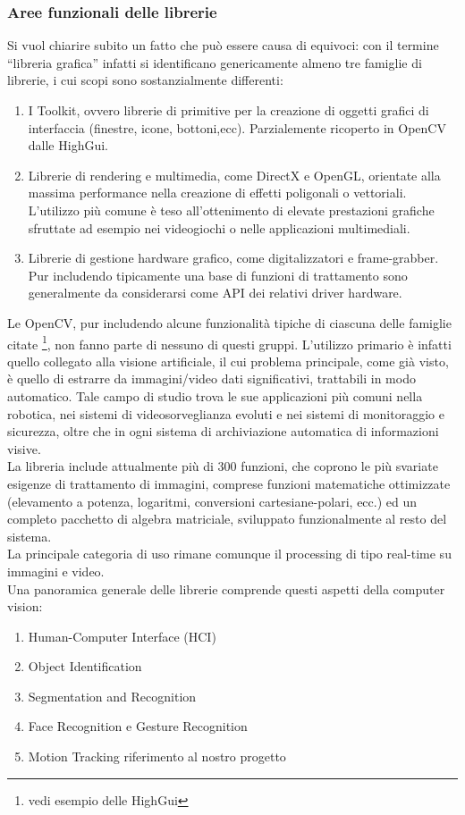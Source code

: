 \subsubsection{Aree funzionali delle librerie}
Si vuol chiarire subito un fatto che può essere causa di equivoci: con il termine ``libreria grafica'' infatti si identificano genericamente almeno tre famiglie di librerie, i cui scopi sono sostanzialmente differenti:
\begin{enumerate}
 \item  I Toolkit, ovvero librerie di primitive per la creazione di oggetti grafici di interfaccia (finestre, icone, bottoni,ecc). Parzialemente ricoperto in OpenCV dalle HighGui.
\item Librerie di rendering e multimedia, come DirectX e OpenGL, orientate alla massima performance nella creazione di effetti poligonali o vettoriali. L’utilizzo più comune è teso all’ottenimento di elevate prestazioni    grafiche sfruttate ad esempio nei videogiochi o nelle applicazioni multimediali.
\item  Librerie di gestione hardware grafico, come digitalizzatori e frame-grabber. Pur includendo tipicamente una base di funzioni di trattamento sono generalmente da considerarsi come API dei relativi driver hardware.
\end{enumerate}

Le OpenCV, pur includendo alcune funzionalità tipiche di ciascuna delle famiglie citate \footnote{vedi esempio delle HighGui}, non fanno parte di nessuno di questi gruppi. L’utilizzo primario è infatti quello collegato alla visione artificiale, il cui problema principale, come già visto, è quello di estrarre da immagini/video dati significativi, trattabili in modo automatico. Tale campo di studio trova le sue applicazioni più comuni nella robotica, nei sistemi di  videosorveglianza evoluti e nei sistemi di monitoraggio e sicurezza, oltre che in ogni sistema di archiviazione automatica di informazioni visive.\\
La libreria include attualmente più di 300 funzioni, che coprono le più svariate esigenze di trattamento di immagini, comprese funzioni matematiche ottimizzate (elevamento a potenza, logaritmi, conversioni cartesiane-polari, ecc.) ed  un completo pacchetto di algebra matriciale, sviluppato funzionalmente al resto del sistema.\\

La principale categoria di uso rimane comunque il processing di tipo real-time su immagini e video. \\
Una panoramica generale delle librerie comprende questi aspetti della computer vision:
\begin{enumerate}
\item Human-Computer Interface (HCI)
\item Object Identification
\item Segmentation and Recognition
\item Face Recognition e Gesture Recognition
\item Motion Tracking  riferimento al nostro progetto
\end{enumerate}


